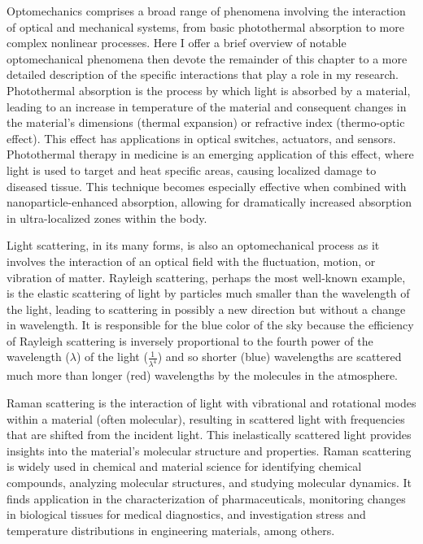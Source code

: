 Optomechanics comprises a broad range of phenomena involving the interaction of optical and mechanical systems, from basic photothermal absorption to more complex nonlinear processes. Here I offer a brief overview of notable optomechanical phenomena then devote the remainder of this chapter to a more detailed description of the specific interactions that play a role in my research. Photothermal absorption is the process by which light is absorbed by a material, leading to an increase in temperature of the material and consequent changes in the material's dimensions (thermal expansion) or refractive index (thermo-optic effect). This effect has applications in optical switches\cite{}, actuators\cite{}, and sensors\cite{}. Photothermal therapy in medicine is an emerging application of this effect, where light is used to target and heat specific areas, causing localized damage to diseased tissue\cite{}. This technique becomes especially effective when combined with nanoparticle-enhanced absorption, allowing for dramatically increased absorption in ultra-localized zones within the body.

Light scattering, in its many forms, is also an optomechanical process as it involves the interaction of an optical field with the fluctuation, motion, or vibration of matter. Rayleigh scattering, perhaps the most well-known example, is the elastic scattering of light by particles much smaller than the wavelength of the light, leading to scattering in possibly a new direction but without a change in wavelength. It is responsible for the blue color of the sky because the efficiency of Rayleigh scattering is inversely proportional to the fourth power of the wavelength ($\lambda$) of the light ($\frac{1}{\lambda^{4}}$) and so shorter (blue) wavelengths are scattered much more than longer (red) wavelengths by the molecules in the atmosphere.

Raman scattering is the interaction of light with vibrational and rotational modes within a material (often molecular), resulting in scattered light with frequencies that are shifted from the incident light. This inelastically scattered light provides insights into the material's molecular structure and properties. Raman scattering is widely used in chemical and material science for identifying chemical compounds, analyzing molecular structures, and studying molecular dynamics. It finds application in the characterization of pharmaceuticals\cite{}, monitoring changes in biological tissues for medical diagnostics\cite{}, and investigation stress and temperature distributions in engineering materials\cite{}, among others\cite{}.

